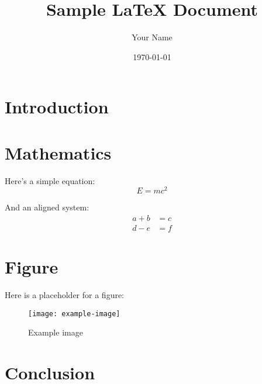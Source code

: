 \documentclass[12pt]{article}
\begin{document}
\title{Sample LaTeX Document}
\author{Your Name}
\date{\today}

\maketitle

\tableofcontents

\section{Introduction}
\lipsum[1]

\section{Mathematics}
Here's a simple equation:
\[
E = mc^2
\]

And an aligned system:
\begin{align*}
a + b &= c \\
d - e &= f
\end{align*}

\section{Figure}
Here is a placeholder for a figure:

\begin{figure}[h!]
\centering
\texttt{[image: example-image]}
\caption{Example image}
\label{fig:sample}
\end{figure}

\section{Conclusion}
\lipsum[2]
\end{document}

